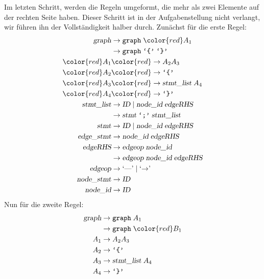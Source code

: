 \begin{loesung}
\begin{teilaufgaben}
Im letzten Schritt, werden die Regeln umgeformt, die mehr als zwei Elemente auf
der rechten Seite haben. Dieser Schritt ist in der Aufgabenstellung nicht verlangt,
wir führen ihn der Vollständigkeit halber durch. Zunächst für die erste Regel:
\begin{align*}
\textsl{graph}     &\rightarrow \texttt{graph}\; {\color{red}A_1} \\
                   &\rightarrow \texttt{graph}\; \texttt{`\{'}\; \texttt{`\}'} \\
\color{red}A_1     &\color{red}\rightarrow A_2A_3\\
\color{red}A_2     &\color{red}\rightarrow \texttt{`\{'}\\
\color{red}A_3     &\color{red}\rightarrow \textsl{stmt\_list}\;A_4\\
\color{red}A_4     &\color{red}\rightarrow \texttt{`\}'}\\
\textsl{stmt\_list}&\rightarrow \textsl{ID}\; |\;
                                \textsl{node\_id}\; \textsl{edgeRHS} \\
                   &\rightarrow \textsl{stmt}\; \texttt{`;'}\; \textsl{stmt\_list}\\
\textsl{stmt}      &\rightarrow \textsl{ID}\; |\;
                                \textsl{node\_id}\; \textsl{edgeRHS} \\
\textsl{edge\_stmt}&\rightarrow \textsl{node\_id}\; \textsl{edgeRHS} \\
\textsl{edgeRHS}   &\rightarrow \textsl{edgeop}\; \textsl{node\_id}\\
                   &\rightarrow \textsl{edgeop}\; \textsl{node\_id}\; \textsl{edgeRHS}\\
\textsl{edgeop}    &\rightarrow \textrm{`\text{---}'}\; |\; \textrm{`$\rightarrow$'}\; \\
\textsl{node\_stmt}&\rightarrow \textsl{ID} \\
\textsl{node\_id}  &\rightarrow \textsl{ID}
\end{align*}
Nun für die zweite Regel:
\begin{align*}
\textsl{graph}     &\rightarrow \texttt{graph}\; A_1 \\
                   &\rightarrow \texttt{graph}\; \color{red}B_1 \\
A_1                &\rightarrow A_2A_3\\
A_2                &\rightarrow \texttt{`\{'}\\
A_3                &\rightarrow \textsl{stmt\_list}\;A_4\\
A_4                &\rightarrow \texttt{`\}'}\\

\end{align*}
\end{teilaufgaben}
\end{loesung}
